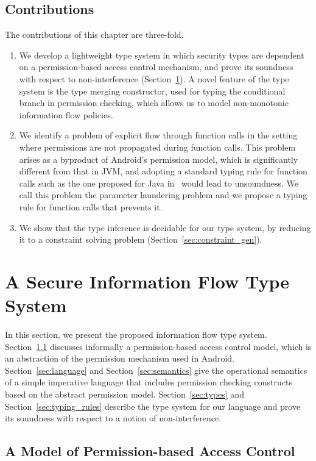 \subsection{Contributions}
The contributions of this chapter are three-fold.
\begin{enumerate}\item We develop a lightweight type system in which security types are dependent on a permission-based access control mechanism, and prove its soundness with respect to non-interference (Section~\ref{sec:type_system}). A novel feature of the type system is the type merging constructor, used for typing the conditional branch in permission checking, which allows us to model non-monotonic information flow policies.
	\item We identify a problem of explicit flow through function calls in the setting where permissions are not propagated during function calls. This problem
	arises as a byproduct of Android's permission model, which is significantly different from that in JVM, and adopting a standard typing rule for function calls such as the one proposed for Java in~\cite{Banerjee:2005ht} 
	would lead to unsoundness. We call this problem the parameter laundering problem and we propose a typing rule for function calls that prevents it.
	\item We show that the type inference is decidable for our type system, by reducing it to a constraint solving problem (Section~\ref{sec:constraint_gen}).
\end{enumerate}
 \section{A Secure Information Flow Type System}\label{sec:type_system}

In this section, we present the proposed information flow type system. Section~\ref{sec:permission_model} discusses informally a permission-based access control model, which is an abstraction of the permission mechanism used in Android.
Section~\ref{sec:language} and Section~\ref{sec:semantics} give the operational semantics of a simple imperative language that includes permission checking
constructs based on the abstract permission model.
Section~\ref{sec:types} and Section~\ref{sec:typing_rules} describe the type system for our language and prove its soundness with respect to a notion of non-interference.

\subsection{A Model of Permission-based Access Control}
\label{sec:permission_model}

